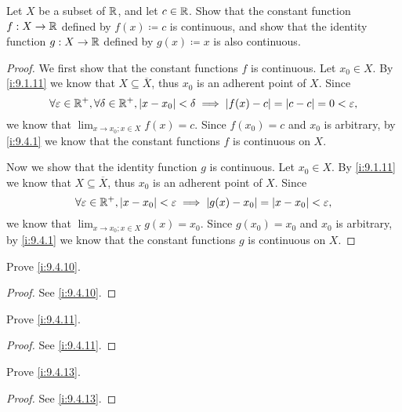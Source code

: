 \begin{ex}\label{i:ex:9.4.2}
  Let \(X\) be a subset of \(\mathbb{R}\), and let \(c \in \mathbb{R}\).
  Show that the constant function \(f : X \to \mathbb{R}\) defined by \(f(x) \coloneqq c\) is continuous, and show that the identity function \(g : X \to \mathbb{R}\) defined by \(g(x) \coloneqq x\) is also continuous.
\end{ex}

\begin{proof}
  We first show that the constant functions \(f\) is continuous.
  Let \(x_0 \in X\).
  By \cref{i:9.1.11} we know that \(X \subseteq \overline{X}\), thus \(x_0\) is an adherent point of \(X\).
  Since
  \[
    \forall \varepsilon \in \mathbb{R}^+, \forall \delta \in \mathbb{R}^+, \left\lvert x - x_0\right\rvert < \delta \implies \left\lvert f(x) - c\right\rvert = \left\lvert c - c\right\rvert = 0 < \varepsilon,
  \]
  we know that \(\lim_{x \to x_0 ; x \in X} f(x) = c\).
  Since \(f(x_0) = c\) and \(x_0\) is arbitrary, by \cref{i:9.4.1} we know that the constant functions \(f\) is continuous on \(X\).

  Now we show that the identity function \(g\) is continuous.
  Let \(x_0 \in X\).
  By \cref{i:9.1.11} we know that \(X \subseteq \overline{X}\), thus \(x_0\) is an adherent point of \(X\).
  Since
  \[
    \forall \varepsilon \in \mathbb{R}^+, \left\lvert x - x_0\right\rvert < \varepsilon \implies \left\lvert g(x) - x_0\right\rvert = \left\lvert x - x_0\right\rvert < \varepsilon,
  \]
  we know that \(\lim_{x \to x_0 ; x \in X} g(x) = x_0\).
  Since \(g(x_0) = x_0\) and \(x_0\) is arbitrary, by \cref{i:9.4.1} we know that the constant functions \(g\) is continuous on \(X\).
\end{proof}

\begin{ex}\label{i:ex:9.4.3}
  Prove \cref{i:9.4.10}.
\end{ex}

\begin{proof}
  See \cref{i:9.4.10}.
\end{proof}

\begin{ex}\label{i:ex:9.4.4}
  Prove \cref{i:9.4.11}.
\end{ex}

\begin{proof}
  See \cref{i:9.4.11}.
\end{proof}

\begin{ex}\label{i:ex:9.4.5}
  Prove \cref{i:9.4.13}.
\end{ex}

\begin{proof}
  See \cref{i:9.4.13}.
\end{proof}

